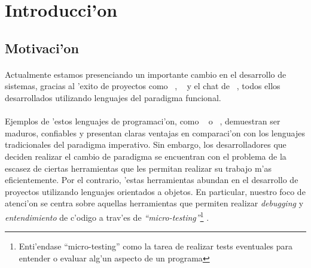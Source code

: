 \documentclass[a4paper]{article}
\begin{document}
\tableofcontents
\newpage

\section{Introducci'on}
\subsection{Motivaci'on}
\begin{epigraphs}
\end{epigraphs}
\paragraph{}Actualmente estamos presenciando un importante cambio en el desarrollo de sistemas, gracias al 'exito de proyectos como ~\cite{couchdb}, ~\cite{ejabberd} y el chat de ~\cite{facebook}, todos ellos desarrollados utilizando lenguajes del paradigma funcional.
\paragraph{}Ejemplos de 'estos lenguajes de programaci'on, como ~\cite{haskell} o ~\cite{erlang}, demuestran ser maduros, confiables y presentan claras ventajas en comparaci'on con los lenguajes tradicionales del paradigma imperativo.  Sin embargo, los desarrolladores que deciden realizar el cambio de paradigma se encuentran con el problema de la escasez de ciertas herramientas que les permitan realizar su trabajo m'as eficientemente.  Por el contrario, 'estas herramientas abundan en el desarrollo de proyectos utilizando lenguajes orientados a objetos.  En particular, nuestro foco de atenci'on se centra sobre aquellas herramientas que permiten realizar \textsl{debugging} y \textsl{entendimiento} de c'odigo a trav'es de \textsl{``micro-testing''}\footnote{Enti'endase ``micro-testing'' como la tarea de realizar tests eventuales para entender o evaluar alg'un aspecto de un programa} .
\end{document}
